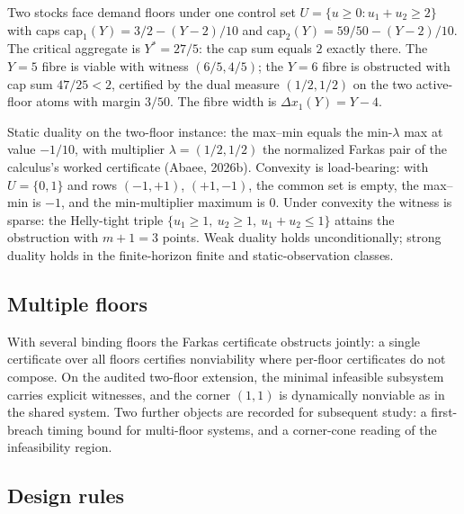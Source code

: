 \documentclass[10pt,twocolumn]{article}
\theoremstyle{definition}
\begin{document}
Two stocks face demand floors under one control set
\(U = \{u \ge 0 : u_1 + u_2 \ge 2\}\) with caps
\(\mathrm{cap}_1(Y) = 3/2 - (Y - 2)/10\) and
\(\mathrm{cap}_2(Y) = 59/50 - (Y - 2)/10\). The critical aggregate is
\(Y^{*} = 27/5\): the cap sum equals \(2\) exactly there. The
\(Y = 5\) fibre is viable with witness \((6/5, 4/5)\); the \(Y = 6\)
fibre is obstructed with cap sum \(47/25 < 2\), certified by the dual
measure \((1/2, 1/2)\) on the two active-floor atoms with margin
\(3/50\). The fibre width is \(\Delta x_1(Y) = Y - 4\).

Static duality on the two-floor instance: the max--min equals the
min-\(\lambda\) max at value \(-1/10\), with multiplier
\(\lambda = (1/2, 1/2)\) the normalized Farkas pair of the calculus's
worked certificate (Abaee, 2026b). Convexity is load-bearing: with
\(U = \{0, 1\}\) and rows \((-1, +1)\), \((+1, -1)\), the common set is
empty, the max--min is \(-1\), and the min-multiplier maximum is
\(0\). Under convexity the witness is sparse: the Helly-tight triple
\(\{u_1 \ge 1,\ u_2 \ge 1,\ u_1 + u_2 \le 1\}\) attains the obstruction
with \(m{+}1 = 3\) points. Weak duality holds unconditionally; strong
duality holds in the finite-horizon finite and static-observation
classes.

\subsection{Multiple floors}\label{floors}

With several binding floors the Farkas certificate obstructs jointly: a
single certificate over all floors certifies nonviability where
per-floor certificates do not compose. On the audited two-floor
extension, the minimal infeasible subsystem carries explicit
witnesses, and the corner \((1,1)\) is dynamically nonviable as in the
shared system. Two further objects are recorded for subsequent study: a
first-breach timing bound for multi-floor systems, and a corner-cone
reading of the infeasibility region.

\subsection{Design rules}\label{rules}
\end{document}
